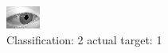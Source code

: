 \begin{figure}[h!]
\begin{center}
\includegraphics[width=0.60\columnwidth]{figures/ID2737_class_2_target_1.png}
\end{center}
\caption{ Classification: 2 actual target: 1}
\label{fig:ID2737_class_2_target_1}
\end{figure}
